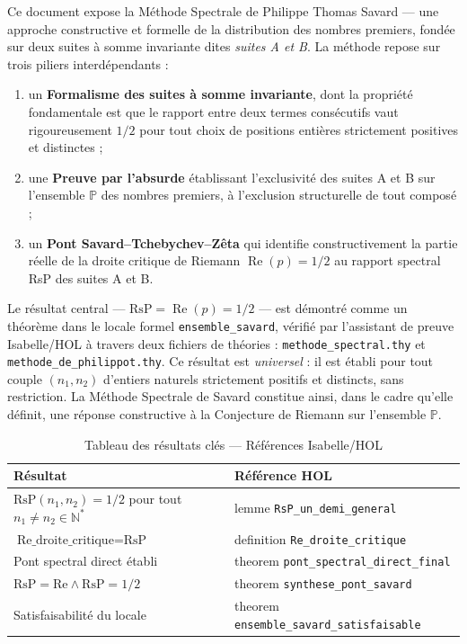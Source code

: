 \documentclass[11pt,a4paper]{article}
\begin{document}
Ce document expose la Méthode Spectrale de Philippe Thomas Savard --- une approche constructive et formelle de la distribution des nombres premiers, fondée sur deux suites à somme invariante dites \emph{suites A et B}. La méthode repose sur trois piliers interdépendants :
\begin{enumerate}
  \item un \textbf{Formalisme des suites à somme invariante}, dont la propriété fondamentale est que le rapport entre deux termes consécutifs vaut rigoureusement $1/2$ pour tout choix de positions entières strictement positives et distinctes ;
  \item une \textbf{Preuve par l'absurde} établissant l'exclusivité des suites A et B sur l'ensemble $\mathbb{P}$ des nombres premiers, à l'exclusion structurelle de tout composé ;
  \item un \textbf{Pont Savard–Tchebychev–Zêta} qui identifie constructivement la partie réelle de la droite critique de Riemann $\operatorname{Re}(p) = 1/2$ au rapport spectral RsP des suites A et B.
\end{enumerate}

Le résultat central --- $\text{RsP} = \operatorname{Re}(p) = 1/2$ --- est démontré comme un théorème dans le locale formel \texttt{ensemble\_savard}, vérifié par l'assistant de preuve Isabelle/HOL à travers deux fichiers de théories : \texttt{methode\_spectral.thy} et \texttt{methode\_de\_philippot.thy}. Ce résultat est \emph{universel} : il est établi pour tout couple $(n_1, n_2)$ d'entiers naturels strictement positifs et distincts, sans restriction. La Méthode Spectrale de Savard constitue ainsi, dans le cadre qu'elle définit, une réponse constructive à la Conjecture de Riemann sur l'ensemble $\mathbb{P}$.

\begin{table}[h]
\centering
\caption{Tableau des résultats clés --- Références Isabelle/HOL}
\begin{tabular}{p{6cm}p{6cm}}
\toprule
\textbf{Résultat} & \textbf{Référence HOL} \\
\midrule
$\text{RsP}(n_1, n_2) = 1/2$ pour tout $n_1 \neq n_2 \in \mathbb{N}^*$ & lemme \texttt{RsP\_un\_demi\_general} \\
$\text{Re\_droite\_critique} = \text{RsP}$ & definition \texttt{Re\_droite\_critique} \\
Pont spectral direct établi & theorem \texttt{pont\_spectral\_direct\_final} \\
$\text{RsP} = \text{Re} \wedge \text{RsP} = 1/2$ & theorem \texttt{synthese\_pont\_savard} \\
Satisfaisabilité du locale & theorem \texttt{ensemble\_savard\_satisfaisable} \\
\bottomrule
\end{tabular}
\end{table}
\end{document}
